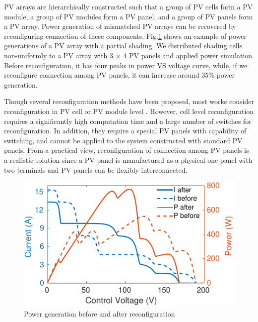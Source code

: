 \documentclass[conference]{pvsctran}
\begin{document}
PV arrays are hierarchically constructed such that a group of PV cells form a PV module, a group of PV modules form a PV panel, and a group of PV panels form a PV array. 
Power generation of mismatched PV arrays can be recovered by reconfiguring connection of these components. 
Fig.\ref{compare} shows an example of power generations of a PV array with a partial shading. 
We distributed shading cells non-uniformly to a PV array with 3 $\times$  4 PV panels and applied power simulation. 
Before reconfiguration, it has four peaks in power VS voltage curve, while,  if we reconfigure connection among PV panels, it can increase around 35\% power generation.

Though several reconfiguration methods have been proposed, most works consider reconfiguration in PV cell or PV module level \cite{nguyen2008adaptive,wang2014architecture,storey2013improved,storey2014optimized,udenze2018reconfiguration}. 
However, cell level reconfiguration requires a significantly high computation time and a large number of switches for reconfiguration. 
In addition, they require a special PV panels with capability of switching, and cannot be applied to the system constructed with standard PV panels. 
From a practical view, reconfiguration of connection among PV panels is a realistic solution since a PV panel is manufactured as a physical one panel with two terminals and PV panels can be flexibly interconnected. 
\begin{figure}[t]
    \centering
    \includegraphics[width=0.8\linewidth]{../fig/compare.png}
    \caption{Power generation before and after reconfiguration}
    \label{compare}
\end{figure}
\end{document}
